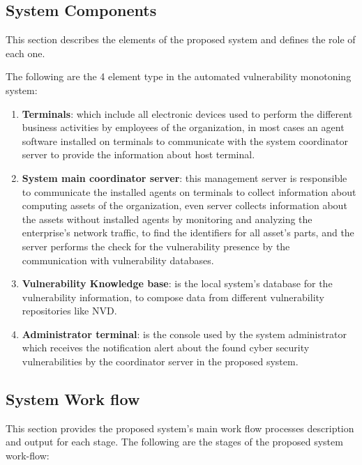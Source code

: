 \documentclass{llncs}
\begin{document}
\subsection{System Components}

\par This section describes the elements of the proposed system and defines the role of each one. 

The following are the 4 element type in the automated vulnerability monotoning system:

\renewcommand{\labelenumi}{\Roman{enumi}}
 \begin{enumerate}
 \item \textbf{Terminals}: which include all electronic devices used to perform the different business activities by employees of the organization, in most cases an agent software installed on terminals to communicate with the system coordinator server to provide the information about host terminal.
 
 \item \textbf{System main coordinator server}: this management server is responsible to communicate the installed agents on terminals to collect information about computing assets of the organization, even server collects information about the assets without installed agents by monitoring and analyzing the enterprise's network traffic, to find the identifiers for all asset's parts, and the server performs the check for the vulnerability presence by the communication with vulnerability databases.
 
 \item \textbf{Vulnerability Knowledge base}: is the local system's database for the vulnerability information, to compose data from different vulnerability repositories like NVD.
 
 
  \item \textbf{Administrator terminal}: is the console used by the system administrator which receives the notification alert about the found cyber security vulnerabilities by the coordinator server in the proposed system.     
 \end{enumerate}
 
\subsection{System Work flow}

\par This section provides the proposed system's main work flow processes description and output for each stage. 
The following are the stages of the proposed system work-flow:
 
\end{document}
